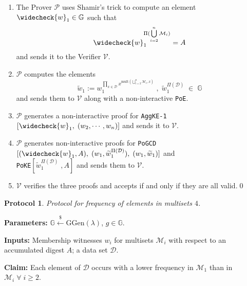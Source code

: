 \documentclass[11pt, lettersize, notitlepage, leqno, footskip=0.6cm]{article}
\newcommand{\pl}{\prod\limits}
\newcommand{\wti}{\widetilde}
\newcommand{\mc}{\mathcal}
\newcommand{\mb}{\mathbb}
\newcommand{\mr}{\mathrm}
\newcommand{\lamb}{\lambda}
\newcommand{\weck}{\widecheck}
\newcommand{\mP}{\mc{P}}
\newcommand{\V}{\mc{V}}
\newcommand{\vs}{\vspace{-0.15cm}}
\newcommand{\noin}{\noindent}
\newtheorem{Prot}[Thm]{Protocol}
\numberwithin{equation}{section}
\begin{document}
\begin{enumerate}[wide, labelwidth=!, labelindent=0pt] \vs

\item The Prover $\mP$ uses Shamir's trick to compute an element $\weck{w}_1\in \mb{G}$ such that \vs $$\weck{w}_1 ^{\Pi(\bigcup\limits_{i=2}^n \mc{M}_i)} = A $$ and sends it to the Verifier $\V$. \vs

\item $\mP$ computes the elements \vs $$\wti{w}_1:= w_1^{\pl_{x\in\mc{D}} x^{\mr{mult}(\bigcup\limits_{i=2}^n \mc{M}_i, x)}}\;,\; \wti{w}_1^{\Pi(\mc{D})}\;\in\;\mb{G}$$ and sends them to $\V$ along with a non-interactive \verb|PoE|. \vs

\item $\mP$ generates a non-interactive proof for \verb|AggKE-1|$[\weck{w}_1,\;(w_2,\cdots,w_n)]$ and sends it to $\V$. \vs

\item $\mP$ generates non-interactive proofs for \verb|PoGCD|$[(\weck{w}_1, A),\;(w_1,\wti{w}_1^{\Pi(\mc{D})}),\;(w_1,\wti{w}_1)]$ and\\ \verb|PoKE|$[\wti{w}_1^{\Pi(\mc{D})}\;,A]$ and sends them to $\V$. \vs

\item $\V$ verifies the three proofs and accepts if and only if they are all valid.\qed\end{enumerate}



\begin{Prot} Protocol for frequency of elements in multisets $4$.\end{Prot} \vspace{-0.3cm}

\noin \textbf{Parameters:} $\mb{G}\xleftarrow{\$} \mr{GGen}(\lamb)$,\; $g\in \mb{G}$.

\noin \textbf{Inputs:} Membership witnesses $w_i$ for multisets $\mc{M}_i$ with respect to an accumulated digest $A$; a data set $\mc{D}$.

\noin \textbf{Claim:} Each element of $\mc{D}$ occurs with a lower frequency in $\mc{M}_1$ than in $\mc{M}_i\;\forall\;i\geq 2$. \vs
\end{document}
